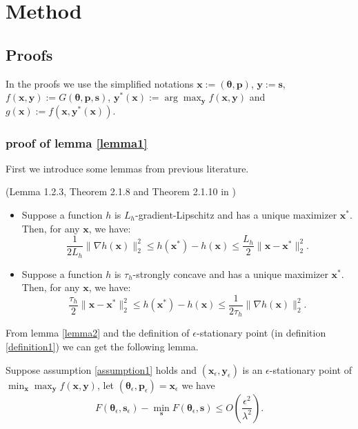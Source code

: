 \section{Method}

\subsection{Proofs}

In the proofs we use the simplified notations ${ \mathbf{x}}:=({ \bm{\theta}},{ \mathbf{p}})$, ${ \mathbf{y}}:={ \mathbf{s}}$, $f({ \mathbf{x}},{ \mathbf{y}}):=G({ \bm{\theta}},{ \mathbf{p}},{ \mathbf{s}})$, ${ \mathbf{y}}^*({ \mathbf{x}}):=\arg\max_{ \mathbf{y}} f({ \mathbf{x}},{ \mathbf{y}})$ and $g({ \mathbf{x}}):=f({ \mathbf{x}},{ \mathbf{y}}^*({ \mathbf{x}})).$ 

\subsubsection{proof of lemma \ref{lemma1}}

First we introduce some lemmas from previous literature.

\begin{lemma} 
\label{lemma2}
(Lemma 1.2.3, Theorem 2.1.8 and Theorem 2.1.10 in \cite{nesterov2013introductory})
\begin{itemize}
    \item Suppose a function \( h \) is \( L_h \)-gradient-Lipschitz and has a unique maximizer \( { \mathbf{x}}^* \). Then, for any \( { \mathbf{x}} \), we have:
    \[
    \frac{1}{2L_h} \|\nabla h({ \mathbf{x}})\|_2^2 \leq h({ \mathbf{x}}^*) - h({ \mathbf{x}}) \leq \frac{L_h}{2} \|{ \mathbf{x}} - { \mathbf{x}}^*\|_2^2. \tag{15}
    \]
    
    \item Suppose a function \( h \) is \( \tau_h \)-strongly concave and has a unique maximizer \( { \mathbf{x}}^* \). Then, for any \( { \mathbf{x}} \), we have:
    \[
    \frac{\tau_h}{2} \|{ \mathbf{x}} - { \mathbf{x}}^*\|_2^2 \leq h({ \mathbf{x}}^*) - h({ \mathbf{x}}) \leq \frac{1}{2\tau_h} \|\nabla h({ \mathbf{x}})\|_2^2. \tag{16}
    \]
\end{itemize}
\end{lemma}

From lemma \ref{lemma2} and the definition of $\epsilon$-stationary point (in definition \ref{definition1}) we can get the following lemma.

\begin{lemma}
\label{lemma3}
    Suppose assumption \ref{assumption1} holds and $({ \mathbf{x}}_\epsilon,{ \mathbf{y}}_\epsilon)$ is an $\epsilon$-stationary point of $\min_{ \mathbf{x}}\max_{ \mathbf{y}} f({ \mathbf{x}},{ \mathbf{y}})$, let $({ \bm{\theta}}_\epsilon,{ \mathbf{p}}_\epsilon)={ \mathbf{x}}_\epsilon$ we have
    $$F({ \bm{\theta}}_\epsilon,{ \mathbf{s}}_\epsilon)-\min_{ \mathbf{s}} F({ \bm{\theta}}_\epsilon,{ \mathbf{s}}) \leq O(\frac{\epsilon^2}{\lambda^2}).$$
\end{lemma}

